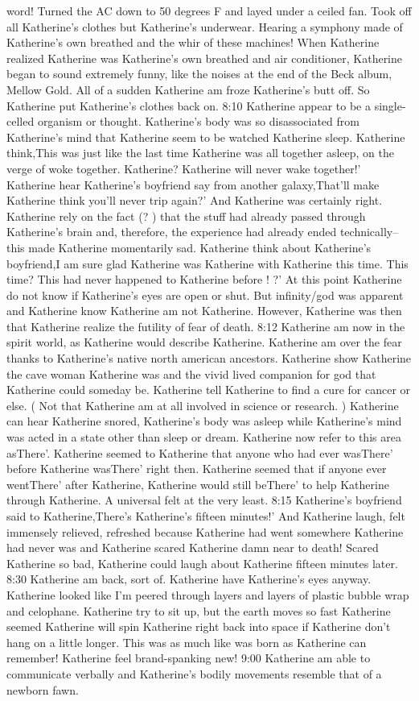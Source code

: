 \documentclass[12pt]{book}
\begin{document}
word! Turned the AC down to 50 degrees F and layed under a ceiled fan. Took off all Katherine's clothes but Katherine's underwear. Hearing a symphony made of Katherine's own breathed and the whir of these machines! When Katherine realized Katherine was Katherine's own breathed and air conditioner, Katherine began to sound extremely funny, like the noises at the end of the Beck album, Mellow Gold. All of a sudden Katherine am froze Katherine's butt off. So Katherine put Katherine's clothes back on. 8:10 Katherine appear to be a single-celled organism or thought. Katherine's body was so disassociated from Katherine's mind that Katherine seem to be watched Katherine sleep. Katherine think,This was just like the last time Katherine was all together asleep, on the verge of woke together. Katherine? Katherine will never wake together!' Katherine hear Katherine's boyfriend say from another galaxy,That'll make Katherine think you'll never trip again?' And Katherine was certainly right. Katherine rely on the fact (? ) that the stuff had already passed through Katherine's brain and, therefore, the experience had already ended technically--this made Katherine momentarily sad. Katherine think about Katherine's boyfriend,I am sure glad Katherine was Katherine with Katherine this time. This time? This had never happened to Katherine before ! ?' At this point Katherine do not know if Katherine's eyes are open or shut. But infinity/god was apparent and Katherine know Katherine am not Katherine. However, Katherine was then that Katherine realize the futility of fear of death. 8:12 Katherine am now in the spirit world, as Katherine would describe Katherine. Katherine am over the fear thanks to Katherine's native north american ancestors. Katherine show Katherine the cave woman Katherine was and the vivid lived companion for god that Katherine could someday be. Katherine tell Katherine to find a cure for cancer or else. ( Not that Katherine am at all involved in science or research. ) Katherine can hear Katherine snored, Katherine's body was asleep while Katherine's mind was acted in a state other than sleep or dream. Katherine now refer to this area asThere'. Katherine seemed to Katherine that anyone who had ever wasThere' before Katherine wasThere' right then. Katherine seemed that if anyone ever wentThere' after Katherine, Katherine would still beThere' to help Katherine through Katherine. A universal felt at the very least. 8:15 Katherine's boyfriend said to Katherine,There's Katherine's fifteen minutes!' And Katherine laugh, felt immensely relieved, refreshed because Katherine had went somewhere Katherine had never was and Katherine scared Katherine damn near to death! Scared Katherine so bad, Katherine could laugh about Katherine fifteen minutes later. 8:30 Katherine am back, sort of. Katherine have Katherine's eyes anyway. Katherine looked like I'm peered through layers and layers of plastic bubble wrap and celophane. Katherine try to sit up, but the earth moves so fast Katherine seemed Katherine will spin Katherine right back into space if Katherine don't hang on a little longer. This was as much like was born as Katherine can remember! Katherine feel brand-spanking new! 9:00 Katherine am able to communicate verbally and Katherine's bodily movements resemble that of a newborn fawn. 
\end{document}
